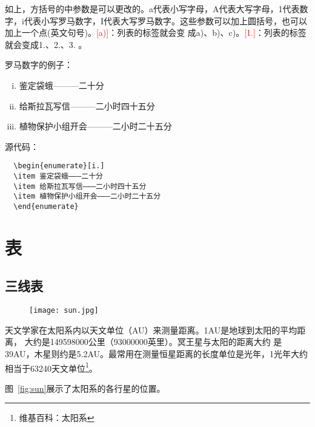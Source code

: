 如上，方括号的中参数是可以更改的。a代表小写字母，A代表大写字母，1代表数
字，i代表小写罗马数字，I代表大写罗马数字。这些参数可以加上圆括号，也可以
加上一个点(英文句号)。\textcolor{red}{[a)]}：列表的标签就会变
成a)、b)、c)。\textcolor{red}{[1.]}：列表的标签就会变成1.、2.、3. 。

罗马数字的例子：
\begin{enumerate}[i.]
\item 鉴定袋蛾———二十分
\item 给斯拉瓦写信———二小时四十五分
\item 植物保护小组开会———二小时二十五分
\end{enumerate}
源代码：
\begin{lstlisting}
  \begin{enumerate}[i.]
  \item 鉴定袋蛾———二十分
  \item 给斯拉瓦写信———二小时四十五分
  \item 植物保护小组开会———二小时二十五分
  \end{enumerate}
\end{lstlisting}

\section{表}

\subsection{三线表}

\begin{figure}[htbp]
  \centering
  \texttt{[image: sun.jpg]}
\end{figure}

天文学家在太阳系内以天文单位（AU）来测量距离。1AU是地球到太阳的平均距离，
大约是\num{149598000}公里（\num{93000000}英里）。冥王星与太阳的距离大约
是39AU，木星则约是5.2AU。最常用在测量恒星距离的长度单位是光年，1光年大约
相当于\num{63240}天文单位\footnote{维基百科：太阳系}。

图~\ref{fig:sun}展示了太阳系的各行星的位置。

